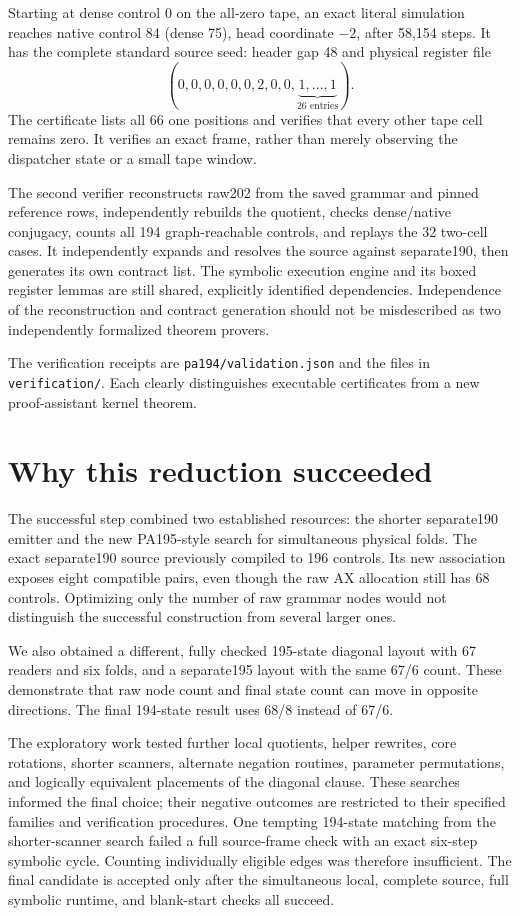 \documentclass[11pt,letterpaper]{article}
\newcommand{\file}[1]{\texttt{\nolinkurl{#1}}}
\begin{document}
Starting at dense control 0 on the all-zero tape, an exact literal
simulation reaches native control 84 (dense 75), head coordinate
$-2$, after 58,154 steps. It has the complete standard source seed:
header gap 48 and physical register file
\[
(0,0,0,0,0,0,2,0,0,\underbrace{1,\ldots,1}_{26\text{ entries}}).
\]
The certificate lists all 66 one positions and verifies that every
other tape cell remains zero. It verifies an exact frame, rather than
merely observing the dispatcher state or a small tape window.

The second verifier reconstructs raw202 from the saved grammar and
pinned reference rows, independently rebuilds the quotient, checks
dense/native conjugacy, counts all 194 graph-reachable controls, and
replays the 32 two-cell cases. It independently expands and resolves
the source against separate190, then generates its own contract list.
The symbolic execution engine and its boxed register lemmas are still
shared, explicitly identified dependencies. Independence of the
reconstruction and contract generation should not be misdescribed as
two independently formalized theorem provers.

The verification receipts are \file{pa194/validation.json} and the
files in \file{verification/}. Each clearly distinguishes executable
certificates from a new proof-assistant kernel theorem.



\section{Why this reduction succeeded}
\label{sec:discussion}
The successful step combined two established resources: the shorter
separate190 emitter and the new PA195-style search for simultaneous
physical folds. The exact separate190 source previously compiled to
196 controls. Its new association exposes eight compatible pairs,
even though the raw AX allocation still has 68 controls. Optimizing
only the number of raw grammar nodes would not distinguish the
successful construction from several larger ones.

We also obtained a different, fully checked 195-state diagonal layout
with 67 readers and six folds, and a separate195 layout with the same
67/6 count. These demonstrate that raw node count and final state
count can move in opposite directions. The final 194-state result
uses 68/8 instead of 67/6.

The exploratory work tested further local quotients, helper rewrites,
core rotations, shorter scanners, alternate negation routines,
parameter permutations, and logically equivalent placements of the
diagonal clause. These searches informed the final choice; their
negative outcomes are restricted to their specified families and
verification procedures. One tempting 194-state matching from the
shorter-scanner search failed a full source-frame check with an exact
six-step symbolic cycle. Counting individually eligible edges was
therefore insufficient. The final candidate is accepted only after
the simultaneous local, complete source, full symbolic runtime, and
blank-start checks all succeed.
\end{document}

